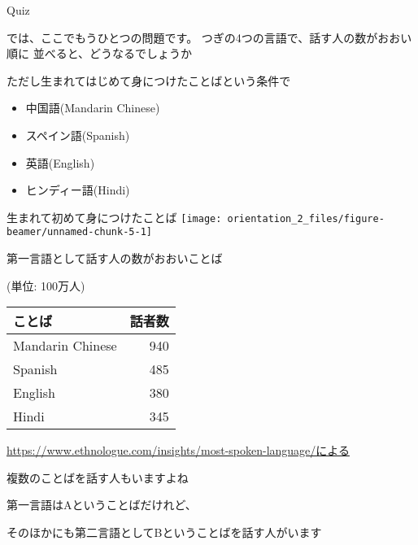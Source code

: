 \documentclass[
  ignorenonframetext,
  aspectratio=169,
  xcolor=dvipsnames]{beamer}
\providecommand{\tightlist}{%
  \setlength{\itemsep}{0pt}\setlength{\parskip}{0pt}}
\begin{document}
\begin{frame}{Quiz}
\label{quiz}
\Large

では、ここでもうひとつの問題です。
つぎの4つの言語で、話す人の数がおおい順に
並べると、どうなるでしょうか\pause

ただし生まれてはじめて身につけたことばという条件で

\pause

\begin{itemize}[<+->]
\tightlist
\item
  中国語(Mandarin Chinese)
\item
  スペイン語(Spanish)
\item
  英語(English)
\item
  ヒンディー語(Hindi)
\end{itemize}
\end{frame}

\begin{frame}{生まれて初めて身につけたことば}
\label{ux751fux307eux308cux3066ux521dux3081ux3066ux8eabux306bux3064ux3051ux305fux3053ux3068ux3070}
\texttt{[image: orientation\_2\_files/figure-beamer/unnamed-chunk-5-1]}
\end{frame}

\begin{frame}{第一言語として話す人の数がおおいことば}
\label{ux7b2cux4e00ux8a00ux8a9eux3068ux3057ux3066ux8a71ux3059ux4ebaux306eux6570ux304cux304aux304aux3044ux3053ux3068ux3070}
\raggedleft

(単位: 100万人)

\vfill

\Large
\centering

\begin{tabular}{lr}
\toprule
ことば & 話者数\\
\midrule
Mandarin Chinese & 940\\
Spanish & 485\\
English & 380\\
Hindi & 345\\
\bottomrule
\end{tabular}

\vfill

\raggedleft
\scriptsize

\url{https://www.ethnologue.com/insights/most-spoken-language/による}
\end{frame}

\begin{frame}{複数のことばを話す人もいますよね}
\label{ux8907ux6570ux306eux3053ux3068ux3070ux3092ux8a71ux3059ux4ebaux3082ux3044ux307eux3059ux3088ux306d}
\Large

第一言語はAということばだけれど、

そのほかにも第二言語としてBということばを話す人がいます
\end{frame}
\end{document}
